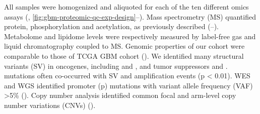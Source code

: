 All samples were homogenized and aliquoted for each of the ten different omics assays (, \ref{fig:gbm-proteomic-qc-exp-design}--). Mass spectrometry (MS) quantified protein, phosphorylation and acetylation, as previously described \cite{douy_zhaog:CPTACUCEC2020,mertinsp_ncicptac:CPTACBreastCancer2016} (--). Metabolome and lipidome levels were respectively measured by label-free gas and liquid chromatography coupled to MS. Genomic properties of our cohort were comparable to those of TCGA GBM cohort \cite{brennancw_chinl:GBM2013} (). We identified many structural variants (SV) in oncogenes, including  and , and tumor suppressors  and .  mutations often co-occurred with  SV and amplification events (p < 0.01). WES and WGS identified  promoter (p) mutations with variant allele frequency (VAF) >5\% (). Copy number analysis identified common focal and arm-level copy number variations (CNVs) ().

